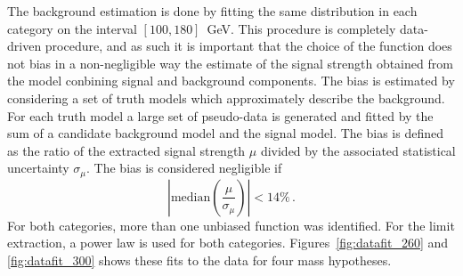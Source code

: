 The background estimation is done by fitting the same distribution in each category on the interval
$[100, 180]$~GeV. This procedure is completely data-driven procedure, and as such it is important
that the choice of the function does not bias in a non-negligible way the estimate of the signal
strength obtained from the model conbining signal and background components.
The bias is estimated by considering a set of truth models which approximately describe the background.
For each truth model a large set of pseudo-data is generated and fitted by the sum of a candidate
background model and the signal model. The bias is defined as the ratio of the extracted signal strength
$\mu$ divided by the associated statistical uncertainty $\sigma_\mu$.
The bias is considered negligible if
\begin{equation}
\left|\text{median}\left(\frac{\mu}{\sigma_\mu}\right)\right| < 14\% \,.
\end{equation}
For both categories, more than one unbiased function was identified. For the limit extraction,
a power law is used for both categories. Figures~\ref{fig:datafit_260} and \ref{fig:datafit_300}
shows these fits to the data for four mass hypotheses.

